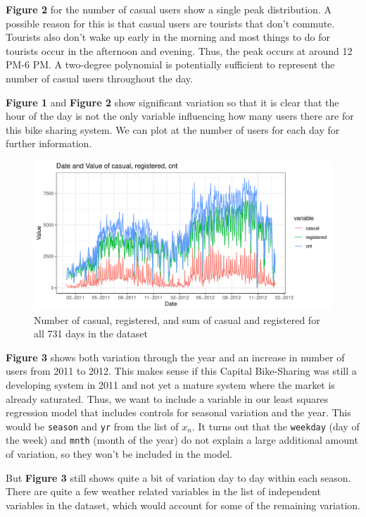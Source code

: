 \documentclass[
]{article}
\begin{document}
\textbf{Figure 2} for the number of casual users show a single peak
distribution. A possible reason for this is that casual users are
tourists that don't commute. Tourists also don't wake up early in the
morning and most things to do for tourists occur in the afternoon and
evening. Thus, the peak occurs at around 12 PM-6 PM. A two-degree
polynomial is potentially sufficient to represent the number of casual
users throughout the day.

\textbf{Figure 1} and \textbf{Figure 2} show significant variation so
that it is clear that the hour of the day is not the only variable
influencing how many users there are for this bike sharing system. We
can plot at the number of users for each day for further information.

\begin{figure}
\centering
\includegraphics{LeastSquares_files/figure-latex/unnamed-chunk-3-1.pdf}
\caption{Number of casual, registered, and sum of casual and registered
for all 731 days in the dataset}
\end{figure}

\textbf{Figure 3} shows both variation through the year and an increase
in number of users from 2011 to 2012. This makes sense if this Capital
Bike-Sharing was still a developing system in 2011 and not yet a mature
system where the market is already saturated. Thus, we want to include a
variable in our least squares regression model that includes controls
for seasonal variation and the year. This would be \texttt{season} and
\texttt{yr} from the list of \(x_{n}\). It turns out that the
\texttt{weekday} (day of the week) and \texttt{mnth} (month of the year)
do not explain a large additional amount of variation, so they won't be
included in the model.

But \textbf{Figure 3} still shows quite a bit of variation day to day
within each season. There are quite a few weather related variables in
the list of independent variables in the dataset, which would account
for some of the remaining variation.
\end{document}
